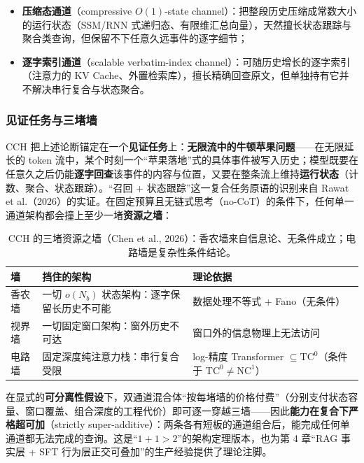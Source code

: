 \documentclass[12pt,a4paper]{article}
\begin{document}
\begin{itemize}
  \item \textbf{压缩态通道}（compressive $O(1)$-state channel）：把整段历史压缩成常数大小的运行状态（SSM/RNN 式递归态、有限维汇总向量），天然擅长状态跟踪与聚合类查询，但保留不下任意久远事件的逐字细节；
  \item \textbf{逐字索引通道}（scalable verbatim-index channel）：可随历史增长的逐字索引（注意力的 KV Cache、外置检索库），擅长精确回查原文，但单独持有它并不解决串行复合与状态聚合。
\end{itemize}

\subsubsection{见证任务与三堵墙}

CCH 把上述论断锚定在一个\textbf{见证任务}上：\textbf{无限流中的牛顿苹果问题}——在无限延长的 token 流中，某个时刻一个“苹果落地”式的具体事件被写入历史；模型既要在任意久之后仍能\textbf{逐字回查}该事件的内容与位置，又要在整条流上维持\textbf{运行状态}（计数、聚合、状态跟踪）。“召回 + 状态跟踪”这一复合任务原语的识别来自 Rawat et al.（2026）的实证。在固定预算且无链式思考（no-CoT）的条件下，任何单一通道架构都会撞上至少一堵\textbf{资源之墙}：

\begin{table}[htbp]
\centering\small
\begin{tabular}{@{}>{\raggedright\arraybackslash}p{1.8cm}>{\raggedright\arraybackslash}p{4.8cm}>{\raggedright\arraybackslash}p{7.2cm}@{}}
\toprule
\textbf{墙} & \textbf{挡住的架构} & \textbf{理论依据}\\
\midrule
香农墙 & 一切 $o(N_b)$ 状态架构：逐字保留长历史不可能 & 数据处理不等式 + Fano（无条件）\\
视界墙 & 一切固定窗口架构：窗外历史不可达 & 窗口外的信息物理上无法访问\\
电路墙 & 固定深度纯注意力栈：串行复合受限 & log-精度 Transformer $\subseteq \mathrm{TC}^0$（条件于 $\mathrm{TC}^0 \neq \mathrm{NC}^1$）\\
\bottomrule
\end{tabular}
\caption{CCH 的三堵资源之墙（Chen et al., 2026）：香农墙来自信息论、无条件成立；电路墙是复杂性条件结论。}
\label{tab:cchwalls}
\end{table}

在显式的\textbf{可分离性假设}下，双通道混合体“按每堵墙的价格付费”（分别支付状态容量、窗口覆盖、组合深度的工程代价）即可逐一穿越三墙——因此\textbf{能力在复合下严格超可加}（strictly super-additive）：两条各有短板的通道组合后，能完成任何单通道都无法完成的查询。这是“$1+1>2$”的架构定理版本，也为第 4 章“RAG 事实层 + SFT 行为层正交可叠加”的生产经验提供了理论注脚。
\end{document}

